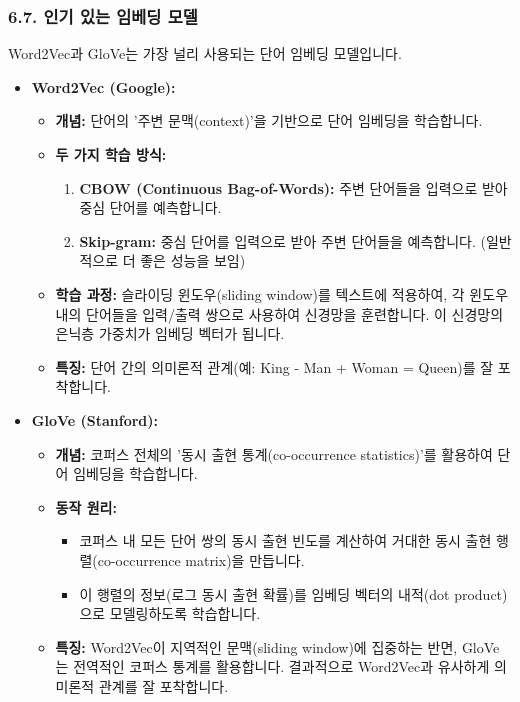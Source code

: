 \documentclass[11pt,a4paper]{article}
\theoremstyle{definition}
\begin{document}
\subsubsection{6.7. 인기 있는 임베딩 모델}
Word2Vec과 GloVe는 가장 널리 사용되는 단어 임베딩 모델입니다.

\begin{itemize}
    \item \textbf{Word2Vec (Google):}
    \begin{itemize}
        \item \textbf{개념:} 단어의 '주변 문맥(context)'을 기반으로 단어 임베딩을 학습합니다.
        \item \textbf{두 가지 학습 방식:}
            \begin{enumerate}
                \item \textbf{CBOW (Continuous Bag-of-Words):} 주변 단어들을 입력으로 받아 중심 단어를 예측합니다.
                \item \textbf{Skip-gram:} 중심 단어를 입력으로 받아 주변 단어들을 예측합니다. (일반적으로 더 좋은 성능을 보임)
            \end{enumerate}
        \item \textbf{학습 과정:} 슬라이딩 윈도우(sliding window)를 텍스트에 적용하여, 각 윈도우 내의 단어들을 입력/출력 쌍으로 사용하여 신경망을 훈련합니다. 이 신경망의 은닉층 가중치가 임베딩 벡터가 됩니다.
        \item \textbf{특징:} 단어 간의 의미론적 관계(예: King - Man + Woman = Queen)를 잘 포착합니다.
    \end{itemize}
    \item \textbf{GloVe (Stanford):}
    \begin{itemize}
        \item \textbf{개념:} 코퍼스 전체의 '동시 출현 통계(co-occurrence statistics)'를 활용하여 단어 임베딩을 학습합니다.
        \item \textbf{동작 원리:}
            \begin{itemize}
                \item 코퍼스 내 모든 단어 쌍의 동시 출현 빈도를 계산하여 거대한 동시 출현 행렬(co-occurrence matrix)을 만듭니다.
                \item 이 행렬의 정보(로그 동시 출현 확률)를 임베딩 벡터의 내적(dot product)으로 모델링하도록 학습합니다.
            \end{itemize}
        \item \textbf{특징:} Word2Vec이 지역적인 문맥(sliding window)에 집중하는 반면, GloVe는 전역적인 코퍼스 통계를 활용합니다. 결과적으로 Word2Vec과 유사하게 의미론적 관계를 잘 포착합니다.
    \end{itemize}
\end{itemize}
\end{document}
